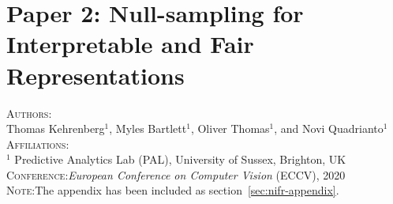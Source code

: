 


% 

% 




\chapter{Paper 2: Null-sampling for Interpretable and Fair Representations}
\textsc{Authors}:\\
Thomas Kehrenberg$^1$, Myles Bartlett$^1$, Oliver Thomas$^1$, and Novi Quadrianto$^1$ \\
\textsc{Affiliations}:\\
$^1$ Predictive Analytics Lab (PAL), University of Sussex, Brighton, UK\\
\textsc{Conference}:\;\;\textit{European Conference on Computer Vision} (ECCV), 2020 \\
\textsc{Note}:\;\;The appendix has been included as section~\ref{sec:nifr-appendix}.

